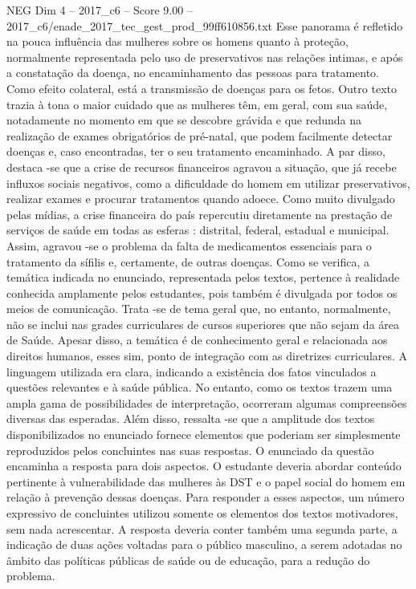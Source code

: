 \begin{textsample}{NEG Dim 4 – 2017\_c6 – Score 9.00 – 2017\_c6/enade\_2017\_tec\_gest\_prod\_99ff610856.txt}
Esse panorama é refletido na pouca influência das mulheres sobre os homens quanto à proteção, normalmente representada pelo uso de preservativos nas relações intimas, e após a constatação da doença, no encaminhamento das pessoas para tratamento.
Como efeito colateral, está a transmissão de doenças para os fetos.
Outro texto trazia à tona o maior cuidado que as mulheres têm, em geral, com sua saúde, notadamente no momento em que se descobre grávida e que redunda na realização de exames obrigatórios de pré-natal, que podem facilmente detectar doenças e, caso encontradas, ter o seu tratamento encaminhado.
A par disso, destaca -se que a crise de recursos financeiros agravou a situação, que já recebe influxos sociais negativos, como a dificuldade do homem em utilizar preservativos, realizar exames e procurar tratamentos quando adoece.
Como muito divulgado pelas mídias, a crise financeira do país repercutiu diretamente na prestação de serviços de saúde em todas as esferas : distrital, federal, estadual e municipal.
Assim, agravou -se o problema da falta de medicamentos essenciais para o tratamento da sífilis e, certamente, de outras doenças.
Como se verifica, a temática indicada no enunciado, representada pelos textos, pertence à realidade conhecida amplamente pelos estudantes, pois também é divulgada por todos os meios de comunicação.
Trata -se de tema geral que, no entanto, normalmente, não se inclui nas grades curriculares de cursos superiores que não sejam da área de Saúde.
Apesar disso, a temática é de conhecimento geral e relacionada aos direitos humanos, esses sim, ponto de integração com as diretrizes curriculares.
A linguagem utilizada era clara, indicando a existência dos fatos vinculados a questões relevantes e à saúde pública.
No entanto, como os textos trazem uma ampla gama de possibilidades de interpretação, ocorreram algumas compreensões diversas das esperadas.
Além disso, ressalta -se que a amplitude dos textos disponibilizados no enunciado fornece elementos que poderiam ser simplesmente reproduzidos pelos concluintes nas suas respostas.
O enunciado da questão encaminha a resposta para dois aspectos.
O estudante deveria abordar conteúdo pertinente à vulnerabilidade das mulheres às DST e o papel social do homem em relação à prevenção dessas doenças.
Para responder a esses aspectos, um número expressivo de concluintes utilizou somente os elementos dos textos motivadores, sem nada acrescentar.
A resposta deveria conter também uma segunda parte, a indicação de duas ações voltadas para o público masculino, a serem adotadas no âmbito das políticas públicas de saúde ou de educação, para a redução do problema.

\end{textsample}
